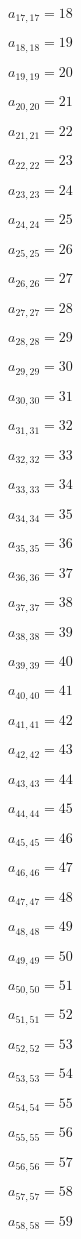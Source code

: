 \documentclass[a4paper,12pt]{article}
\begin{document}
$a _{ 17, 17 } = 18$

$a _{ 18, 18 } = 19$

$a _{ 19, 19 } = 20$

$a _{ 20, 20 } = 21$

$a _{ 21, 21 } = 22$

$a _{ 22, 22 } = 23$

$a _{ 23, 23 } = 24$

$a _{ 24, 24 } = 25$

$a _{ 25, 25 } = 26$

$a _{ 26, 26 } = 27$

$a _{ 27, 27 } = 28$

$a _{ 28, 28 } = 29$

$a _{ 29, 29 } = 30$

$a _{ 30, 30 } = 31$

$a _{ 31, 31 } = 32$

$a _{ 32, 32 } = 33$

$a _{ 33, 33 } = 34$

$a _{ 34, 34 } = 35$

$a _{ 35, 35 } = 36$

$a _{ 36, 36 } = 37$

$a _{ 37, 37 } = 38$

$a _{ 38, 38 } = 39$

$a _{ 39, 39 } = 40$

$a _{ 40, 40 } = 41$

$a _{ 41, 41 } = 42$

$a _{ 42, 42 } = 43$

$a _{ 43, 43 } = 44$

$a _{ 44, 44 } = 45$

$a _{ 45, 45 } = 46$

$a _{ 46, 46 } = 47$

$a _{ 47, 47 } = 48$

$a _{ 48, 48 } = 49$

$a _{ 49, 49 } = 50$

$a _{ 50, 50 } = 51$

$a _{ 51, 51 } = 52$

$a _{ 52, 52 } = 53$

$a _{ 53, 53 } = 54$

$a _{ 54, 54 } = 55$

$a _{ 55, 55 } = 56$

$a _{ 56, 56 } = 57$

$a _{ 57, 57 } = 58$

$a _{ 58, 58 } = 59$
\end{document}

